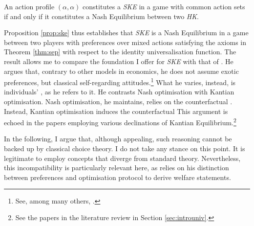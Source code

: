 \begin{prop}\label{prop:ske}
	An action profile \( (\alpha, \alpha) \) constitutes a \textit{SKE} in a game with common action sets if and only if it constitutes a Nash Equilibrium between two \textit{HK}.
\end{prop}

Proposition \ref{prop:ske} thus establishes that \textit{SKE} is a Nash Equilibrium in a game between two players with preferences over mixed actions satisfying the axioms in Theorem \ref{thm:sep} with respect to the identity universalisation function. The result allows me to compare the foundation I offer for \textit{SKE} with that of \cite{roemer2019we}. He argues that, contrary to other models in economics, he does not assume exotic preferences, but classical self-regarding attitudes.\footnote{See, among many others, \citet[p. 69]{roemer2019we}.} What he varies, instead, is individuals' , as he refers to it. He contrasts Nash optimisation with Kantian optimisation. Nash optimisation, he maintains, relies on the counterfactual . Instead, Kantian optimisation induces the counterfactual  This argument is echoed in the papers employing various declinations of Kantian Equilibrium.\footnote{See the papers in the literature review in Section \ref{sec:introuniv}.}

In the following, I argue that, although appealing, such reasoning cannot be backed up by classical choice theory. I do not take any stance on this point. It is legitimate to employ concepts that diverge from standard theory. Nevertheless, this incompatibility is particularly relevant here, as \citeauthor{roemer2019we} relies on his distinction between preferences and optimisation protocol to derive welfare statements.

